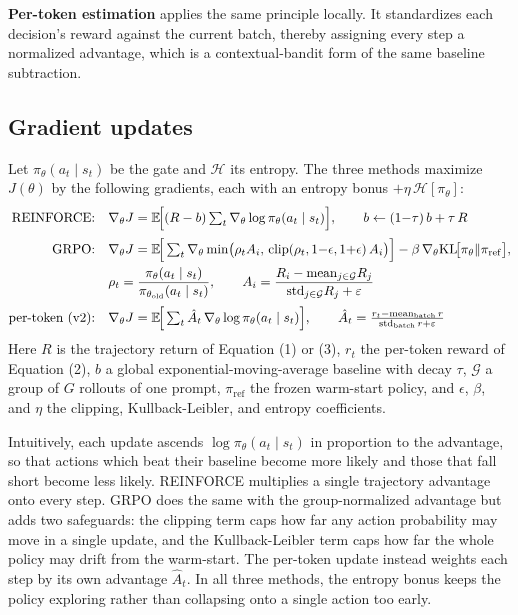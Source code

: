 \documentclass[11pt]{article}
\begin{document}
\textbf{Per-token estimation} applies the same principle locally. It standardizes each decision's reward
against the current batch, thereby assigning every step a normalized advantage, which is a
contextual-bandit form of the same baseline subtraction.

\subsection{Gradient updates}
Let $\pi_\theta(a_t\mid s_t)$ be the gate and $\mathcal{H}$ its entropy. The three methods maximize
$J(\theta)$ by the following gradients, each with an entropy bonus $+\eta\,\mathcal{H}[\pi_\theta]$:
\begin{align}
\text{REINFORCE:}\quad
&\nabla_\theta J = \mathbb{E}\!\Big[(R-b)\textstyle\sum_t \nabla_\theta\log\pi_\theta(a_t\mid s_t)\Big],
\qquad b \leftarrow (1{-}\tau)\,b + \tau\,R \\[2pt]
\text{GRPO:}\quad
&\nabla_\theta J = \mathbb{E}\!\Big[\textstyle\sum_t \nabla_\theta \min\!\big(\rho_t A_i,\,
\mathrm{clip}(\rho_t,1{-}\epsilon,1{+}\epsilon)\,A_i\big)\Big] - \beta\,\nabla_\theta\mathrm{KL}\!\big[\pi_\theta\Vert\pi_{\mathrm{ref}}\big], \notag\\
&\rho_t = \frac{\pi_\theta(a_t\mid s_t)}{\pi_{\theta_{\mathrm{old}}}(a_t\mid s_t)},
\qquad A_i = \frac{R_i-\mathrm{mean}_{j\in\mathcal{G}}R_j}{\mathrm{std}_{j\in\mathcal{G}}R_j+\varepsilon} \\[2pt]
\text{per-token (v2):}\quad
&\nabla_\theta J = \mathbb{E}\!\Big[\textstyle\sum_t \hat A_t\,\nabla_\theta\log\pi_\theta(a_t\mid s_t)\Big],
\qquad \hat A_t = \frac{r_t-\mathrm{mean}_{\mathrm{batch}}\,r}{\mathrm{std}_{\mathrm{batch}}\,r+\varepsilon}
\end{align}
Here $R$ is the trajectory return of Equation (1) or (3), $r_t$ the per-token reward of Equation (2),
$b$ a global exponential-moving-average baseline with decay $\tau$, $\mathcal{G}$ a group of $G$
rollouts of one prompt, $\pi_{\mathrm{ref}}$ the frozen warm-start policy, and $\epsilon$, $\beta$, and
$\eta$ the clipping, Kullback-Leibler, and entropy coefficients.

Intuitively, each update ascends $\log\pi_\theta(a_t\mid s_t)$ in proportion to the advantage, so that
actions which beat their baseline become more likely and those that fall short become less likely.
REINFORCE multiplies a single trajectory advantage onto every step. GRPO does the same with the
group-normalized advantage but adds two safeguards: the clipping term caps how far any action
probability may move in a single update, and the Kullback-Leibler term caps how far the whole policy
may drift from the warm-start. The per-token update instead weights each step by its own advantage
$\hat A_t$. In all three methods, the entropy bonus keeps the policy exploring rather than collapsing
onto a single action too early.
\end{document}
